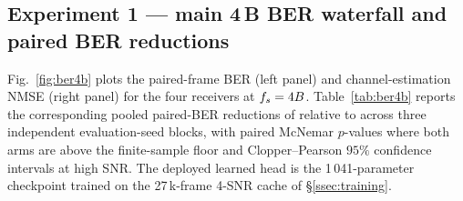 \begin{table}[t]
\centering
\caption{Simulation parameters. One configuration is used for every receiver in every experiment.}
\label{tab:simparams}
\end{table}

\subsection{Experiment 1 --- main 4\,B BER waterfall and paired BER reductions}
\label{ssec:exp1}

Fig.~\ref{fig:ber4b} plots the paired-frame BER (left panel) and channel-estimation NMSE (right panel) for the four receivers at $f_s = 4B$. Table~\ref{tab:ber4b} reports the corresponding pooled paired-BER reductions of \LearnedHead{} relative to \ClassicalJoint{} across three independent evaluation-seed blocks, with paired McNemar $p$-values where both arms are above the finite-sample floor and Clopper--Pearson $95\%$ confidence intervals at high SNR. The deployed learned head is the 1\,041-parameter checkpoint trained on the 27\,k-frame 4-SNR cache of \S\ref{ssec:training}.

